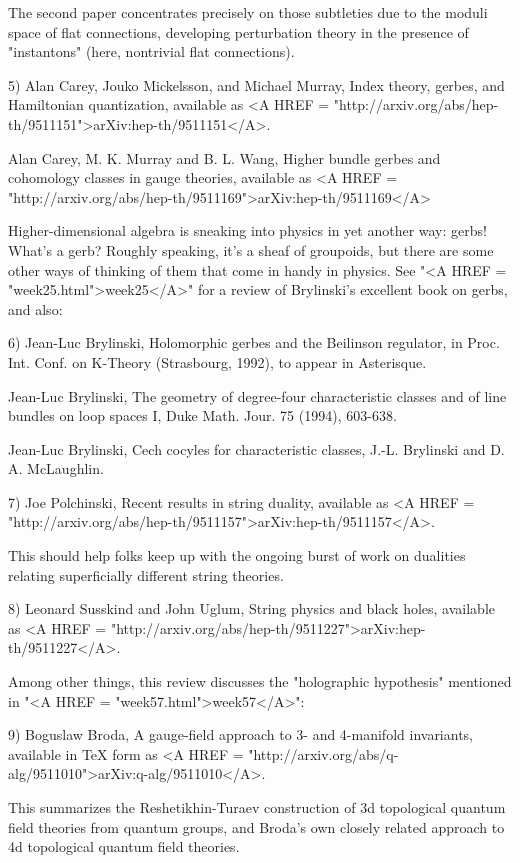 The second paper concentrates precisely on those subtleties due to the
moduli space of flat connections, developing perturbation theory in the
presence of "instantons" (here, nontrivial flat connections).  

5) Alan Carey, Jouko Mickelsson, and Michael Murray, Index theory,
gerbes, and Hamiltonian quantization, available as <A HREF =
"http://arxiv.org/abs/hep-th/9511151">arXiv:hep-th/9511151</A>.

Alan Carey, M. K. Murray and B. L. Wang, Higher bundle gerbes and
cohomology classes in gauge theories, available as
<A HREF = "http://arxiv.org/abs/hep-th/9511169">arXiv:hep-th/9511169</A>


Higher-dimensional algebra is sneaking into physics in yet another way:
gerbs!  What's a gerb?  Roughly speaking, it's a sheaf of groupoids, but
there are some other ways of thinking of them that come in handy in
physics.  See "<A HREF = "week25.html">week25</A>" for a
review of Brylinski's excellent book on gerbs, and also:


6) Jean-Luc Brylinski, Holomorphic gerbes and the Beilinson regulator,
in Proc. Int. Conf. on K-Theory (Strasbourg, 1992), to appear in
Asterisque.  

Jean-Luc Brylinski, The geometry of degree-four characteristic classes
and of line bundles on loop spaces I, Duke Math. Jour. 75 (1994),
603-638.  

Jean-Luc Brylinski, Cech cocyles for characteristic classes, J.-L.
Brylinski and D. A. McLaughlin.

7) Joe Polchinski, Recent results in string duality, available
as <A HREF = "http://arxiv.org/abs/hep-th/9511157">arXiv:hep-th/9511157</A>.

This should help folks keep up with the ongoing burst of work on
dualities relating superficially different string theories. 


8)  Leonard Susskind and John Uglum, String physics and black holes, 
available as <A HREF = "http://arxiv.org/abs/hep-th/9511227">arXiv:hep-th/9511227</A>.

Among other things, this review discusses 
the "holographic hypothesis" 
mentioned in "<A HREF = "week57.html">week57</A>":

9) Boguslaw Broda, A gauge-field approach to 3- and 4-manifold
invariants, available in TeX form as <A HREF = "http://arxiv.org/abs/q-alg/9511010">arXiv:q-alg/9511010</A>.  

This summarizes the Reshetikhin-Turaev construction of 3d topological
quantum field theories from quantum groups, and Broda's own closely
related approach to 4d topological quantum field theories.  

